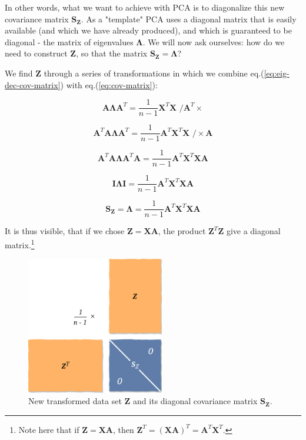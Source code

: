 \documentclass[10pt,twocolumn]{article}
\begin{document}
In other words, what we want to achieve with PCA is to diagonalize this new covariance matrix $\bm{S_Z}$. As a "template" PCA uses a diagonal matrix that is easily available (and which we have already produced), and which is guaranteed to be diagonal - the matrix of eigenvalues $\bm{\Lambda}$. We will now ask ourselves: how do we need to construct $\bm{Z}$, so that the matrix $\bm{S_Z} = \bm{\Lambda}$?

We find $\bm{Z}$ through a series of transformations in which we combine eq.(\ref{eq:eig-dec-cov-matrix}) with eq.(\ref{eq:cov-matrix}):

\begin{equation}
\bm{A} \bm{\Lambda} \bm{A}^T =  \frac{1}{n-1} \bm{X}^T \bm{X} \,\, \Big/ \bm{A}^T \times
\end{equation}

\begin{equation}
\bm{A}^T \bm{A} \bm{\Lambda} \bm{A}^T =  \frac{1}{n-1} \bm{A}^T  \bm{X}^T \bm{X} \,\, \Big/ \times \bm{A}
\end{equation}

\begin{equation}
\bm{A}^T \bm{A} \bm{\Lambda} \bm{A}^T \bm{A} =  \frac{1}{n-1} \bm{A}^T  \bm{X}^T \bm{X} \bm{A}
\end{equation}

\begin{equation}
\bm{I} \bm{\Lambda} \bm{I} =  \frac{1}{n-1} \bm{A}^T  \bm{X}^T \bm{X} \bm{A}
\end{equation}

\begin{equation}
\bm{S_Z}  = \bm{\Lambda} = \frac{1}{n-1} \bm{A}^T  \bm{X}^T \bm{X} \bm{A}
\end{equation}

It is thus visible, that if we chose $\bm{Z} = \bm{X} \bm{A}$, the product $\bm{Z}^T \bm{Z}$ give a diagonal matrix.\footnote{Note here that if $\bm{Z} = \bm{X} \bm{A}$, then $\bm{Z}^T = (\bm{X} \bm{A})^T = \bm{A}^T \bm{X}^T$.}

\begin{figure}[H]
\centering\includegraphics[width=6cm]{PC-scores.png}
\caption{New transformed data set $\bm{Z}$ and its diagonal covariance matrix $\bm{S_Z}$.}
\label{fig:PC-scores}
\end{figure}
\end{document}
